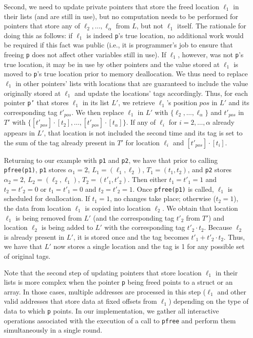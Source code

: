 \documentclass[11pt]{article}
\begin{document}
Second, we need to update private pointers that store the freed location
$\ell_1$ in their lists (and are still in use), but no computation needs to
be performed for pointers that store any of $\ell_2, {\ldots}, \ell_\alpha$
from $L$, but not $\ell_1$ itself. The rationale for doing this as follows:
if $\ell_1$ is indeed \texttt{p}'s true location, no additional work would
be required if this fact was public (i.e., it is programmer's job to ensure
that freeing \texttt{p} does not affect other variables still in use). If
$\ell_1$, however, was not \texttt{p}'s true location, it may be in use by
other pointers and the value stored at $\ell_1$ is moved to \texttt{p}'s
true location prior to memory deallocation. We thus need to replace $\ell_1$
in other pointers' lists with locations that are guaranteed to include the
value originally stored at $\ell_1$ and update the locations' tags
accordingly. Thus, for each pointer \texttt{p'} that stores $\ell_1$ in its
list $L'$, we retrieve $\ell_1$'s position $pos$ in $L'$ and its
corresponding tag $t'_{pos}$. We then replace $\ell_1$ in $L'$ with
$\{\ell_2, {\ldots}, \ell_{\alpha}\}$ and $t'_{pos}$ in $T'$ with
$\{[t'_{pos}]\cdot [t_2], {\ldots}, [t'_{pos}]\cdot [t_{\alpha}]\}$. If any of
$\ell_i$ for $i = 2, {\ldots}, \alpha$ already appears in $L'$, that
location is not included the second time and its tag is set to the sum of
the tag already present in $T'$ for location $\ell_i$ and $[t'_{pos}] \cdot
[t_i]$.

Returning to our example with \texttt{p1} and \texttt{p2}, we have that
prior to calling \texttt{pfree(p1)}, \texttt{p1} stores $\alpha_1 = 2$, $L_1
= (\ell_1, \ell_2)$, $T_1 = (t_1, t_2)$, and \texttt{p2} stores $\alpha_2 =
2$, $L_2 = (\ell_2, \ell_1)$, $T_2 = (t'_1, t'_2)$. Then either $t_1 = t'_1
= 1$ and $t_2 = t'_2 = 0$ or $t_1 = t'_1 = 0$ and $t_2 = t'_2 = 1$. Once
\texttt{pfree(p1)} is called, $\ell_1$ is scheduled for deallocation. If
$t_1 = 1$, no changes take place; otherwise ($t_2 = 1$), the data from
location $\ell_1$ is copied into location $\ell_2$. We obtain that location
$\ell_1$ is being removed from $L'$ (and the corresponding tag $t'_2$ from
$T'$) and location $\ell_2$ is being added to $L'$ with the corresponding
tag $t'_2 \cdot t_2$. Because $\ell_2$ is already present in $L'$, it is
stored once and the tag becomes $t'_1 + t'_2 \cdot t_2$. Thus, we have that
$L'$ now stores a single location and the tag is 1 for any possible set of
original tags. 

Note that the second step of updating pointers that store location $\ell_1$
in their lists is more complex when the pointer \texttt{p} being freed
points to a struct or an array. In those cases, multiple addresses are
processed in this step ($\ell_1$ and other valid addresses that store data
at fixed offsets from $\ell_1$) depending on the type of data to which
\texttt{p} points. In our implementation, we gather all interactive
operations associated with the execution of a call to \texttt{pfree} and
perform them simultaneously in a single round.
\end{document}
